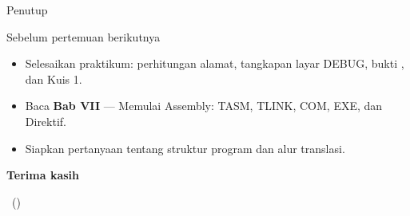 \documentclass[aspectratio=169,11pt]{beamer}
\begin{document}
\begin{frame}{Penutup}
\begin{block}{Sebelum pertemuan berikutnya}
\small
\begin{itemize}
    \item Selesaikan praktikum: perhitungan alamat, tangkapan layar
          DEBUG, bukti , dan Kuis 1.
    \item Baca \textbf{Bab VII} — Memulai Assembly: TASM, TLINK,
          COM, EXE, dan Direktif.
    \item Siapkan pertanyaan tentang struktur program dan alur
          translasi.
\end{itemize}
\end{block}

\vspace{0.4em}
\begin{center}
{\color{obeBlue}\sffamily\large\bfseries Terima kasih\par}
\vspace{0.15em}
{\color{obeGray}\sffamily\small \NamaMK\ (\KodeMK)
\textbullet\ \SemesterTeks\par}
\end{center}
\end{frame}
\end{document}
